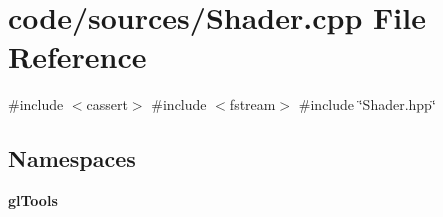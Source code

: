 \section{code/sources/\+Shader.cpp File Reference}
\label{_shader_8cpp}
{\ttfamily \#include $<$cassert$>$}\newline
{\ttfamily \#include $<$fstream$>$}\newline
{\ttfamily \#include \char`\"{}Shader.\+hpp\char`\"{}}\newline
\subsection*{Namespaces}
\begin{DoxyCompactItemize}
\item 
 \textbf{ gl\+Tools}
\end{DoxyCompactItemize}
